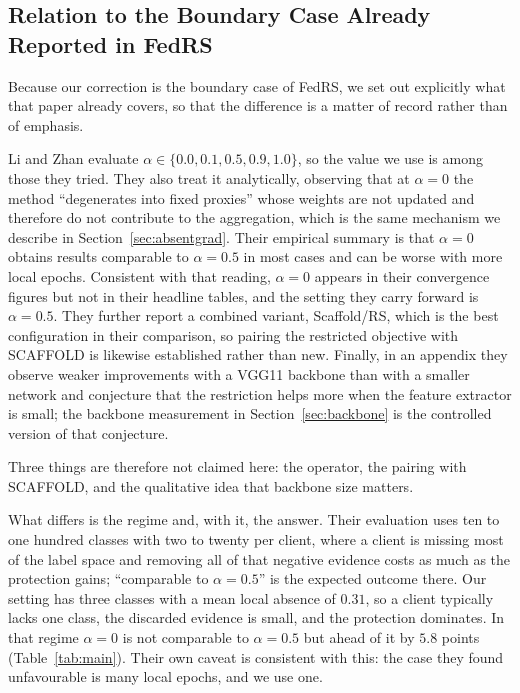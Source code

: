 \documentclass[journal]{IEEEtran}
\begin{document}
\subsection{Relation to the Boundary Case Already Reported in FedRS}
\label{sec:fedrs_relation}
Because our correction is the boundary case of FedRS, we set out explicitly what
that paper already covers, so that the difference is a matter of record rather
than of emphasis.

Li and Zhan evaluate $\alpha \in \{0.0, 0.1, 0.5, 0.9, 1.0\}$, so the value we
use is among those they tried. They also treat it analytically, observing that
at $\alpha = 0$ the method ``degenerates into fixed proxies'' whose weights are
not updated and therefore do not contribute to the aggregation, which is the same
mechanism we describe in Section~\ref{sec:absentgrad}. Their empirical summary is
that $\alpha = 0$ obtains results comparable to $\alpha = 0.5$ in most cases and
can be worse with more local epochs. Consistent with that reading, $\alpha = 0$
appears in their convergence figures but not in their headline tables, and the
setting they carry forward is $\alpha = 0.5$. They further report a combined
variant, Scaffold/RS, which is the best configuration in their comparison,
so pairing the restricted objective with SCAFFOLD is likewise established rather
than new. Finally, in an appendix they observe weaker improvements with a VGG11
backbone than with a smaller network and conjecture that the restriction helps
more when the feature extractor is small; the backbone measurement in
Section~\ref{sec:backbone} is the controlled version of that conjecture.

Three things are therefore not claimed here: the operator, the pairing with
SCAFFOLD, and the qualitative idea that backbone size matters.

What differs is the regime and, with it, the answer. Their evaluation uses ten
to one hundred classes with two to twenty per client, where a client is missing
most of the label space and removing all of that negative evidence costs as much
as the protection gains; ``comparable to $\alpha = 0.5$'' is the expected outcome
there. Our setting has three classes with a mean local absence of $0.31$, so a
client typically lacks one class, the discarded evidence is small, and the
protection dominates. In that regime $\alpha = 0$ is not comparable to
$\alpha = 0.5$ but ahead of it by $5.8$ points
(Table~\ref{tab:main}). Their own caveat is consistent with this: the case they
found unfavourable is many local epochs, and we use one.
\end{document}
